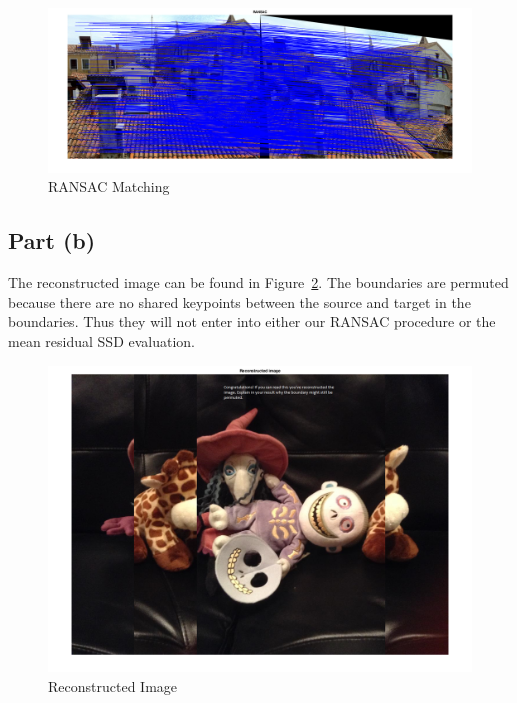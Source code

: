 \documentclass[12pt]{article}
\begin{document}
\begin{figure}[ht]
    \includegraphics[width=\linewidth]{output/prob2a_output_ransac.png}
    \caption{RANSAC Matching}
    \label{fig:prob2a_ransac}
\end{figure}



\subsection*{Part (b)}

The reconstructed image can be found in Figure~\ref{fig:prob2b}. The boundaries
are permuted because there are no shared keypoints between the source and target
in the boundaries. Thus they will not enter into either our RANSAC procedure or
the mean residual SSD evaluation.

\begin{figure}[ht]
    \includegraphics[width=\linewidth]{output/prob2b_output.png}
    \caption{Reconstructed Image}
    \label{fig:prob2b}
\end{figure}
\end{document}
